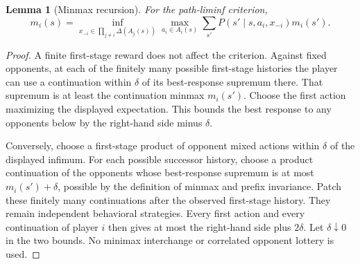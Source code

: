 \documentclass[11pt,a4paper]{article}
\newtheorem{lemma}[theorem]{Lemma}
\theoremstyle{definition}
\theoremstyle{remark}
\begin{document}
\begin{lemma}[Minmax recursion]
For the path-liminf criterion,
\[
 m_i(s)=\inf_{x_{-i}\in\prod_{j\ne i}\Delta(A_j(s))}
      \max_{a_i\in A_i(s)}\sum_{s'}P(s'\mid s,a_i,x_{-i})m_i(s').
\]
\end{lemma}
\begin{proof}
A finite first-stage reward does not affect the criterion. Against fixed opponents, at each of the finitely many possible first-stage histories the player can use a continuation within $\delta$ of its best-response supremum there. That supremum is at least the continuation minmax $m_i(s')$. Choose the first action maximizing the displayed expectation. This bounds the best response to any opponents below by the right-hand side minus $\delta$.

Conversely, choose a first-stage product of opponent mixed actions within $\delta$ of the displayed infimum. For each possible successor history, choose a product continuation of the opponents whose best-response supremum is at most $m_i(s')+\delta$, possible by the definition of minmax and prefix invariance. Patch these finitely many continuations after the observed first-stage history. They remain independent behavioral strategies. Every first action and every continuation of player $i$ then gives at most the right-hand side plus $2\delta$. Let $\delta\downarrow0$ in the two bounds. No minimax interchange or correlated opponent lottery is used.
\end{proof}
\end{document}
